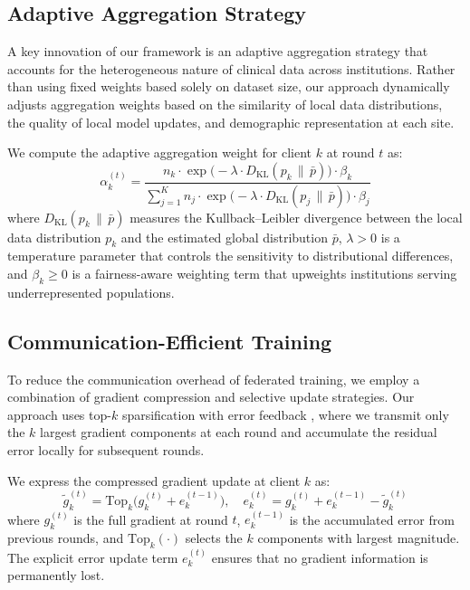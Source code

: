 \documentclass[12pt,letterpaper]{article}
\begin{document}
\subsection{Adaptive Aggregation Strategy}
\label{sec:adaptive}

A key innovation of our framework is an adaptive aggregation strategy that accounts for the heterogeneous nature of clinical data across institutions. Rather than using fixed weights based solely on dataset size, our approach dynamically adjusts aggregation weights based on the similarity of local data distributions, the quality of local model updates, and demographic representation at each site.

We compute the adaptive aggregation weight for client $k$ at round $t$ as:
\begin{equation}
\alpha_k^{(t)} = \frac{n_k \cdot \exp\bigl(-\lambda \cdot D_{\mathrm{KL}}(p_k \,\|\, \bar{p})\bigr) \cdot \beta_k}{\sum_{j=1}^{K} n_j \cdot \exp\bigl(-\lambda \cdot D_{\mathrm{KL}}(p_j \,\|\, \bar{p})\bigr) \cdot \beta_j}
\label{eq:adaptive}
\end{equation}
where $D_{\mathrm{KL}}(p_k \,\|\, \bar{p})$ measures the Kullback--Leibler divergence between the local data distribution $p_k$ and the estimated global distribution $\bar{p}$, $\lambda > 0$ is a temperature parameter that controls the sensitivity to distributional differences, and $\beta_k \geq 0$ is a fairness-aware weighting term that upweights institutions serving underrepresented populations.

\subsection{Communication-Efficient Training}

To reduce the communication overhead of federated training, we employ a combination of gradient compression and selective update strategies. Our approach uses top-$k$ sparsification with error feedback \citep{Stich2018}, where we transmit only the $k$ largest gradient components at each round and accumulate the residual error locally for subsequent rounds.

We express the compressed gradient update at client $k$ as:
\begin{equation}
\tilde{g}_k^{(t)} = \text{Top}_k\!\bigl(g_k^{(t)} + e_k^{(t-1)}\bigr), \quad e_k^{(t)} = g_k^{(t)} + e_k^{(t-1)} - \tilde{g}_k^{(t)}
\end{equation}
where $g_k^{(t)}$ is the full gradient at round $t$, $e_k^{(t-1)}$ is the accumulated error from previous rounds, and $\text{Top}_k(\cdot)$ selects the $k$ components with largest magnitude. The explicit error update term $e_k^{(t)}$ ensures that no gradient information is permanently lost.
\end{document}
